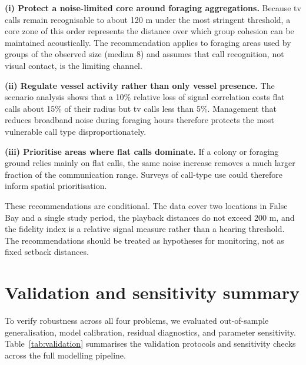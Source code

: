 \documentclass{apmcmthesis}
\begin{document}
\textbf{(i) Protect a noise-limited core around foraging aggregations.} Because tv calls remain
recognisable to about 120 m under the most stringent threshold, a core zone of this order
represents the distance over which group cohesion can be maintained acoustically. The
recommendation applies to foraging areas used by groups of the observed size (median 8) and
assumes that call recognition, not visual contact, is the limiting channel.

\textbf{(ii) Regulate vessel activity rather than only vessel presence.} The scenario analysis
shows that a 10\% relative loss of signal correlation costs flat calls about 15\% of their radius
but tv calls less than 5\%. Management that reduces broadband noise during foraging hours
therefore protects the most vulnerable call type disproportionately.

\textbf{(iii) Prioritise areas where flat calls dominate.} If a colony or foraging ground relies
mainly on flat calls, the same noise increase removes a much larger fraction of the communication
range. Surveys of call-type use could therefore inform spatial prioritisation.

These recommendations are conditional. The data cover two locations in False Bay and a single
study period, the playback distances do not exceed 200 m, and the fidelity index is a relative
signal measure rather than a hearing threshold. The recommendations should be treated as
hypotheses for monitoring, not as fixed setback distances.

\section{Validation and sensitivity summary}

To verify robustness across all four problems, we evaluated out-of-sample generalisation, model calibration, residual diagnostics, and parameter sensitivity. Table~\ref{tab:validation} summarises the validation protocols and sensitivity checks across the full modelling pipeline.
\end{document}
